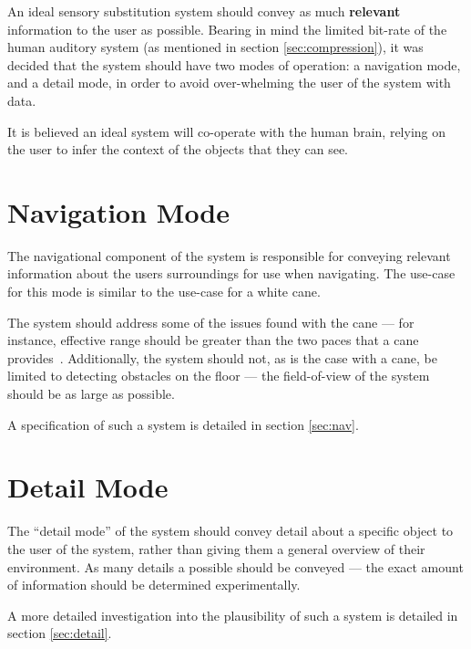 An ideal sensory substitution system should convey as much \textbf{relevant} information to the user as possible. Bearing in mind the limited bit-rate of the human auditory system (as mentioned in section \ref{sec:compression}), it was decided that the system should have two modes of operation: a navigation mode, and a detail mode, in order to avoid over-whelming the user of the system with data.

It is believed an ideal system will co-operate with the human brain, relying on the user to infer the context of the objects that they can see.

\section{Navigation Mode}
The navigational component of the system is responsible for conveying relevant information about the users surroundings for use when navigating. The use-case for this mode is similar to the use-case for a white cane.

The system should address some of the issues found with the cane --- for instance, effective range should be greater than the two paces that a cane provides~\cite{mobilityenhancement}. Additionally, the system should not, as is the case with a cane, be limited to detecting obstacles on the floor --- the field-of-view of the system should be as large as possible.

A specification of such a system is detailed in section \ref{sec:nav}.

\section{Detail Mode}
The ``detail mode'' of the system should convey detail about a specific object to the user of the system, rather than giving them a general overview of their environment. As many details a possible should be conveyed --- the exact amount of information should be determined experimentally. 

A more detailed investigation into the plausibility of such a system is detailed in section \ref{sec:detail}.
